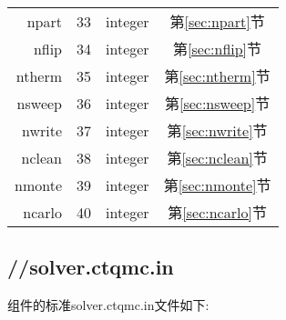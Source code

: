 \begin{longtable}{rccc}
npart    & 33       & integer  &第\ref{sec:npart}节 \\
nflip    & 34       & integer  &第\ref{sec:nflip}节 \\
ntherm   & 35       & integer  &第\ref{sec:ntherm}节\\
nsweep   & 36       & integer  &第\ref{sec:nsweep}节\\
nwrite   & 37       & integer  &第\ref{sec:nwrite}节\\
nclean   & 38       & integer  &第\ref{sec:nclean}节\\
nmonte   & 39       & integer  &第\ref{sec:nmonte}节\\
ncarlo   & 40       & integer  &第\ref{sec:ncarlo}节\\
\hline
\hline
\end{longtable}

\subsection{{\lavender}//solver.ctqmc.in}

{\lavender}组件的标准solver.ctqmc.in文件如下:

